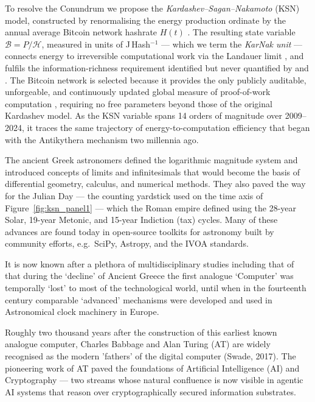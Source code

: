 \documentclass[final,5p,times,twocolumn,authoryear]{elsarticle}
\begin{document}
To resolve the Conundrum we propose the
\textit{Kardashev--Sagan--Nakamoto} (KSN) model, constructed by
renormalising the energy production ordinate by the annual average
Bitcoin network hashrate $H(t)$ \citep{nak2009}. The resulting
state variable $\mathscr{B} = P/\mathcal{H}$, measured in units of J\,Hash$^{-1}$
--- which we term the \textit{KarNak unit} --- connects energy
to irreversible computational work via the Landauer limit
\citep{Landauer1961}, and fulfils the information-richness
requirement identified but never quantified by \citet{kar64}
and \citet{sagan73}. The Bitcoin network is selected because
it provides the only publicly auditable, unforgeable, and
continuously updated global measure of proof-of-work computation
\citep{nak2009}, requiring no free parameters beyond those of
the original Kardashev model. As the KSN variable spans
14 orders of magnitude over 2009--2024, it traces the same
trajectory of energy-to-computation efficiency that began with
the Antikythera mechanism two millennia ago.
 
 The ancient Greek astronomers defined the logarithmic magnitude system and introduced concepts of limits and infinitesimals that would become the basis of differential geometry, calculus, and numerical methods. They also paved the way for the Julian Day — the counting yardstick used on the time axis of Figure~\ref{fig:ksn_panel1} — which the Roman empire defined using the 28-year Solar, 19-year Metonic, and 15-year Indiction (tax) cycles. Many of these advances are found today in open-source toolkits for astronomy built by community efforts, e.g.\ SciPy, Astropy, and the IVOA standards.
 
 It is now known after a plethora of multidisciplinary studies including that of \cite{Freeth2021} that during the `decline' of Ancient Greece the first analogue `Computer' was temporally `lost' to most of the technological world, until when in the fourteenth century comparable `advanced' mechanisms were developed and used in Astronomical clock machinery in Europe. 
 
 Roughly two thousand years after the construction of this earliest known analogue computer, Charles Babbage and Alan Turing (AT)
are widely recognised as the modern 'fathers' of the digital computer
(Swade, 2017). The pioneering work of AT paved the foundations of
Artificial Intelligence (AI) and Cryptography --- two streams whose
natural confluence is now visible in agentic AI systems that reason
over cryptographically secured information substrates.
 
\end{document}
